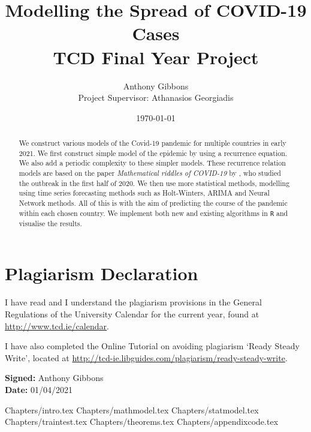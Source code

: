 \documentclass[a4paper]{article}
\title{Modelling the Spread of COVID-19 Cases \\ \large{TCD Final Year Project}}
\author{Anthony Gibbons \\  \normalsize{Project Supervisor: Athanasios Georgiadis}}
\date{\today}
\begin{document}
\maketitle      
\renewcommand\lstlistlistingname{List of Code}

\begin{abstract}
    We construct various models of the Covid-19 pandemic for multiple countries in early 2021. We first construct simple model of the epidemic by using a recurrence equation. We also add a periodic complexity to these simpler models. These recurrence relation models are based on the paper \textit{Mathematical riddles of COVID-19} by \citeauthor{grigor20} \cite{grigor20}, who studied the outbreak in the first half of 2020. We then use more statistical methods, modelling using time series forecasting methods such as Holt-Winters, ARIMA and Neural Network methods. All of this is with the aim of predicting the course of the pandemic within each chosen country. We implement both new and existing algorithms in \verb|R| and visualise the results.
\end{abstract}
\pagebreak
\section*{Plagiarism Declaration}
I have read and I understand the plagiarism provisions in the General
Regulations of the University Calendar for the current year, found at
\url{http://www.tcd.ie/calendar}.

I have also completed the Online Tutorial on avoiding plagiarism
‘Ready Steady Write’, located at
\url{http://tcd-ie.libguides.com/plagiarism/ready-steady-write}.

\textbf{Signed:} Anthony Gibbons \\
\textbf{Date:} 01/04/2021
\pagebreak

\hypersetup{
    linkcolor=black,
}

\tableofcontents \pagebreak

\listoffigures \pagebreak

\lstlistoflistings 

\listoftables \pagebreak

{Chapters/intro.tex}
\pagebreak
{Chapters/mathmodel.tex}
\pagebreak
{Chapters/statmodel.tex}
\pagebreak
{Chapters/traintest.tex}
\pagebreak
\appendix
{Chapters/theorems.tex}
\pagebreak
{Chapters/appendixcode.tex}
\pagebreak 
\printbibliography
\end{document}
